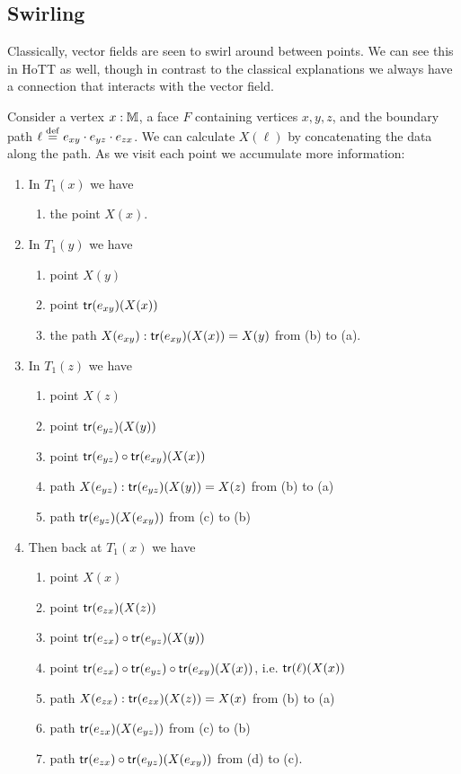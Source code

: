 \subsection{Swirling}
Classically, vector fields are seen to swirl around between points. We can see this in HoTT as well, though in contrast to the classical explanations we always have a connection that interacts with the vector field. 

Consider a vertex \( x:\mathbb{M} \), a face \( F \) containing vertices \( x, y, z \), and the boundary path \( \ell\stackrel{\mathrm{def}}{=} e_{xy}\cdot e_{yz} \cdot e_{zx} \). We can calculate \( X(\ell) \) by concatenating the data along the path. As we visit each point we accumulate more information:

\begin{enumerate}
\item In \( T_1(x) \) we have 
\begin{enumerate}
\item the point \( X(x) \).
\end{enumerate}
\item In \( T_1(y) \) we have
\begin{enumerate}
\item point \( X(y) \)
\item point \( \mathsf{tr}(e_{xy})(X(x)) \)
\item the path \( X(e_{xy}):\mathsf{tr}(e_{xy})(X(x))=X(y) \) from (b) to (a).
\end{enumerate}
\item In \( T_1(z) \) we have 
\begin{enumerate}
\item point \( X(z) \)
\item point \( \mathsf{tr}(e_{yz})(X(y)) \)
\item point \( \mathsf{tr}(e_{yz})\circ\mathsf{tr}(e_{xy})(X(x)) \)
\item path \( X(e_{yz}):\mathsf{tr}(e_{yz})(X(y))=X(z) \) from (b) to (a)
\item path \( \mathsf{tr}(e_{yz})(X(e_{xy})) \) from (c) to (b)
\end{enumerate}
\item Then back at \( T_1(x) \) we have
\begin{enumerate}
\item point \( X(x) \)
\item point \( \mathsf{tr}(e_{zx})(X(z)) \)
\item point \( \mathsf{tr}(e_{zx})\circ\mathsf{tr}(e_{yz})(X(y)) \)
\item point \( \mathsf{tr}(e_{zx})\circ\mathsf{tr}(e_{yz})\circ\mathsf{tr}(e_{xy})(X(x)) \), i.e. \( \mathsf{tr}(\ell)(X(x)) \)
\item path \( X(e_{zx}): \mathsf{tr}(e_{zx})(X(z))=X(x) \) from (b) to (a)
\item path \( \mathsf{tr}(e_{zx})(X(e_{yz})) \) from (c) to (b)
\item path \( \mathsf{tr}(e_{zx})\circ\mathsf{tr}(e_{yz})(X(e_{xy})) \) from (d) to (c).
\end{enumerate}
\end{enumerate}

